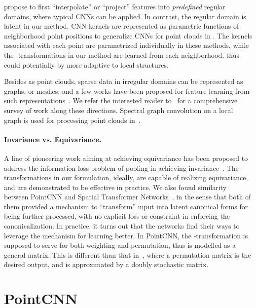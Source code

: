 \documentclass{article}
\begin{document}
\cite{Su_CVPR18,Atzmon_SIGGRAPH18,Tatarchenko_CVPR18} propose to first ``interpolate'' or ``project'' features into \emph{predefined} regular domains, where typical CNNs can be applied. In contrast, the regular domain is latent in our method. CNN kernels are represented as parametric functions of neighborhood point positions to generalize CNNs for point clouds in \cite{Wang_CVPR18_Deep,Groh_arXiv18,Xu_arXiv18}. The kernels associated with each point are parametrized individually in these methods, while the -transformations in our method are learned from each neighborhood, thus could potentially by more adaptive to local structures.

Besides as point clouds, sparse data in irregular domains can be represented as graphs, or meshes, and a few works have been proposed for feature learning from such representations~\cite{Monti_CVPR17,Yi_CVPR17,Maron_SIGGRAPH17}. We refer the interested reader to~\cite{Bronstein_17} for a comprehensive survey of work along these directions. Spectral graph convolution on a local graph is used for processing point clouds in~\cite{Wang_arXiv18_mg}.

\paragraph{Invariance vs. Equivariance.}
A line of pioneering work aiming at achieving equivariance has been proposed to address the information loss problem of pooling in achieving invariance~\cite{hinton2011transforming,sabour2017dynamic}. The -transformations in our formulation, ideally, are capable of realizing equivariance, and are demonstrated to be effective in practice. We also found similarity between PointCNN and Spatial Transformer Networks~\cite{Jaderberg_NIPS15}, in the sense that both of them provided a mechanism to ``transform'' input into latent canonical forms for being further processed, with no explicit loss or constraint in enforcing the canonicalization. In practice, it turns out that the networks find their ways to leverage the mechanism for learning better. In PointCNN, the -transformation is supposed to serve for both weighting and permutation, thus is modelled as a general matrix. This is different than that in~\cite{Cruz_CVPR17}, where a permutation matrix is the desired output, and is approximated by a doubly stochastic matrix. \section{P\lowercase{oint}CNN}
\label{sec:pointcnn}
\end{document}
